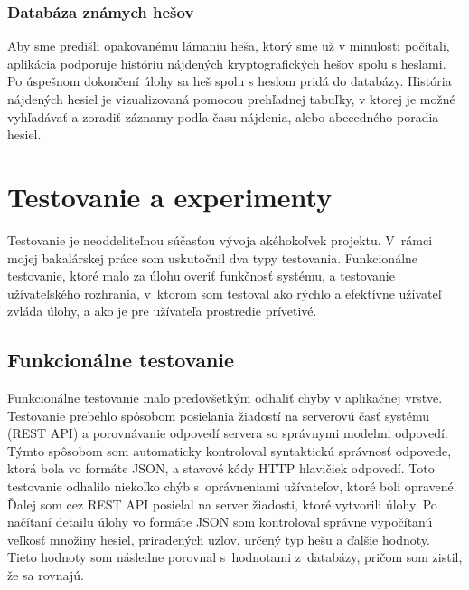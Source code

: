 \documentclass[zadani,slovak]{fitthesis}
\begin{document}
\subsection{Databáza známych hešov}
Aby sme predišli opakovanému lámaniu heša, ktorý sme už v minulosti počítali, aplikácia podporuje históriu nájdených kryptografických hešov spolu s heslami. Po úspešnom dokončení úlohy sa heš spolu s heslom pridá do databázy. História nájdených hesiel je vizualizovaná pomocou prehľadnej tabuľky, v ktorej je možné vyhľadávať a zoradiť záznamy podľa času nájdenia, alebo abecedného poradia hesiel.


\chapter{Testovanie a experimenty}\label{testovanie}
Testovanie je neoddeliteľnou súčasťou vývoja akéhokoľvek projektu. V~rámci mojej bakalárskej práce som uskutočnil dva typy testovania. Funkcionálne testovanie, ktoré malo za úlohu overiť funkčnosť systému, a testovanie užívateľského rozhrania, v~ktorom som testoval ako rýchlo a efektívne užívateľ zvláda úlohy, a ako je pre užívateľa  prostredie prívetivé.

\section{Funkcionálne testovanie}
Funkcionálne testovanie malo predovšetkým odhaliť chyby v aplikačnej vrstve. Testovanie prebehlo spôsobom posielania žiadostí na serverovú časť systému (REST API) a porovnávanie odpovedí servera so správnymi modelmi odpovedí. Týmto spôsobom som automaticky kontroloval syntaktickú správnosť odpovede, ktorá bola vo formáte JSON, a stavové kódy HTTP hlavičiek odpovedí. Toto testovanie odhalilo niekoľko chýb s~oprávneniami užívateľov, ktoré boli opravené. Ďalej som cez REST API posielal na server žiadosti, ktoré vytvorili úlohy. Po načítaní detailu úlohy vo formáte JSON som kontroloval správne vypočítanú veľkosť množiny hesiel, priradených uzlov, určený typ hešu a ďalšie hodnoty. Tieto hodnoty som následne porovnal s~hodnotami z~databázy, pričom som zistil, že sa rovnajú.
\end{document}
